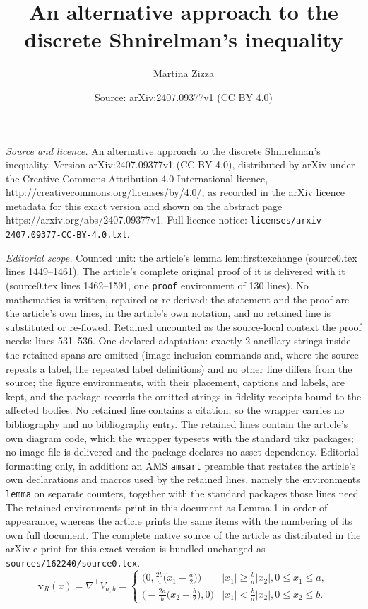 \documentclass[10pt,a4paper]{amsart}
\title{An alternative approach to the discrete Shnirelman's inequality}
\author{Martina Zizza}
\date{Source: arXiv:2407.09377v1 (CC BY 4.0)}
\begin{document}
\maketitle

\noindent\emph{Source and licence.} An alternative approach to the discrete Shnirelman's inequality. Version arXiv:2407.09377v1 (CC BY 4.0), distributed by arXiv under the Creative Commons Attribution 4.0 International licence, http://creativecommons.org/licenses/by/4.0/, as recorded in the arXiv licence metadata for this exact version and shown on the abstract page https://arxiv.org/abs/2407.09377v1. Full licence notice: \texttt{licenses/arxiv-2407.09377-CC-BY-4.0.txt}.\par\smallskip

\noindent\textit{Editorial scope.} Counted unit: the article's lemma lem:first:exchange (source0.tex lines 1449--1461). The article's complete original proof of it is delivered with it (source0.tex lines 1462--1591, one \texttt{proof} environment of 130 lines). No mathematics is written, repaired or re-derived: the statement and the proof are the article's own lines, in the article's own notation, and no retained line is substituted or re-flowed.  Retained uncounted as the source-local context the proof needs: lines 531--536.  One declared adaptation: exactly 2 ancillary strings inside the retained spans are omitted (image-inclusion commands and, where the source repeats a label, the repeated label definitions) and no other line differs from the source; the figure environments, with their placement, captions and labels, are kept, and the package records the omitted strings in fidelity receipts bound to the affected bodies.  No retained line contains a citation, so the wrapper carries no bibliography and no bibliography entry.  The retained lines contain the article's own diagram code, which the wrapper typesets with the standard tikz packages; no image file is delivered and the package declares no asset dependency.  Editorial formatting only, in addition: an AMS \texttt{amsart} preamble that restates the article's own declarations and macros used by the retained lines, namely the environments \texttt{lemma} on separate counters, together with the standard packages those lines need.  The retained environments print in this document as Lemma 1 in order of appearance, whereas the article prints the same items with the numbering of its own full document.  The complete native source of the article as distributed in the arXiv e-print for this exact version is bundled unchanged as \texttt{sources/162240/source0.tex}.
\begin{equation}\label{eq:rot:vf:rectangle}
\mathbf v_R(x) = \nabla^\perp V_{a,b} = \begin{cases}
\big( 0, \frac{2b}{a} \big( x_1 - \frac{a}{2} \big) \big) & |x_1| \geq \frac{b}{a} |x_2|, 0 \leq x_1 \leq a, \\
\big( -\frac{2a}{b} \big( x_2 - \frac{b}{2} \big),0 \big) & |x_1| < \frac{b}{a} |x_2|, 0 \leq x_2 \leq b.
\end{cases}
\end{equation}
\end{document}
